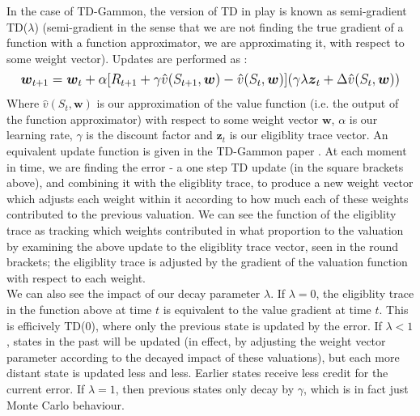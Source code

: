 \documentclass[12pt]{article}
\begin{document}
In the case of TD-Gammon, the version of TD in play is known as semi-gradient TD($\lambda$) (semi-gradient in the sense that we are not finding the true gradient of a function with a function approximator, we are approximating it, with respect to some weight vector). Updates are performed as \autocite{rlintrochap12}:
\begin{equation}
    \mathlarger{
        \boldsymbol{w}_{t+1} = \boldsymbol{w}_t + \alpha[R_{t+1} + \gamma \hat{v}(S_{t+1},\boldsymbol{w})-\hat{v}(S_t,\boldsymbol{w})](\gamma\lambda\boldsymbol{z}_t + \Delta\hat{v}(S_t,\boldsymbol{w}))
    }
\end{equation} 
Where $\hat{v}(S_t,\boldsymbol{w})$ is our approximation of the value function (i.e. the output of the function approximator) with respect to some weight vector $\boldsymbol{w}$, $\alpha$ is our learning rate, $\gamma$ is the discount factor and $\boldsymbol{z}_t$ is our eligiblity trace vector. An equivalent update function is given in the TD-Gammon paper \autocite{tesauro1995temporal}. At each moment in time, we are finding the error - a one step TD update (in the square brackets above), and combining it with the eligiblity trace, to produce a new weight vector which adjusts each weight within it according to how much each of these weights contributed to the previous valuation. We can see the function of the eligiblity trace as tracking which weights contributed in what proportion to the valuation by examining the above update to the eligiblity trace vector, seen in the round brackets; the eligiblity trace is adjusted by the gradient of the valuation function with respect to each weight. \\\newline
We can also see the impact of our decay parameter $\lambda$. If $\lambda = 0$, the eligiblity trace in the function above at time $t$ is equivalent to the value gradient at time $t$. This is efficively TD(0), where only the previous state is updated by the error. If $\lambda<1$, states in the past will be updated (in effect, by adjusting the weight vector parameter according to the decayed impact of these valuations), but each more distant state is updated less and less. Earlier states receive less credit for the current error. If $\lambda=1$, then previous states only decay by $\gamma$, which is in fact just Monte Carlo behaviour. \\\newline
\end{document}
